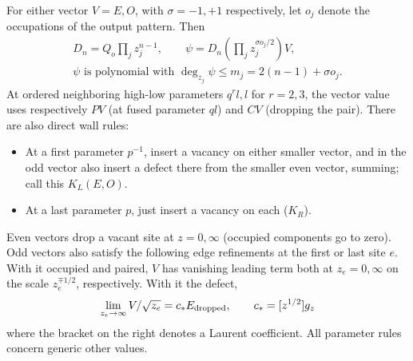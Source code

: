 \begin{proposition}\label{L:prop:strip-polynomials}
For either vector \(V=E,O\), with \(\sigma=-1,+1\) respectively, let \(o_j\)
denote the occupations of the output pattern. Then
\[
\begin{gathered}
 D_n=Q_o\prod_j z_j^{n-1},\qquad
 \psi= D_n \left(\prod_j z_j^{\sigma o_j/2}\right)V,\\
 \psi\text{ is polynomial with }\deg_{z_j}\psi\le m_j=2(n-1)+\sigma o_j.
\end{gathered}
\]
At ordered neighboring high-low parameters \(q^r l,l\) for \(r=2,3\), the vector value uses respectively \(P V\) (at fused parameter \(q l\)) and \(C V\) (dropping the pair). There are also direct wall rules:
\begin{itemize}
\item At a first parameter \(p^{-1}\), insert a vacancy on either smaller vector, and in the odd vector also insert a defect there from the smaller even vector, summing; call this \(K_L(E,O)\).
\item At a last parameter \(p\), just insert a vacancy on each (\(K_R\)).
\end{itemize}

Even vectors drop a vacant site at \(z=0,\infty\) (occupied components go to zero). Odd vectors also satisfy the following edge refinements at the first or last site \(e\). With it occupied and paired, \(V\) has vanishing leading term both at \(z_e=0,\infty\) on the scale \(z_e^{\mp1/2}\), respectively. With it the defect,
\[
 \lim_{z_e\to\infty} V/\sqrt{z_e}=c_* E_{\rm dropped},\qquad
 c_*=[z^{1/2}]g_z
\]
where the bracket on the right denotes a Laurent coefficient. All parameter rules concern generic other values.

\end{proposition}
